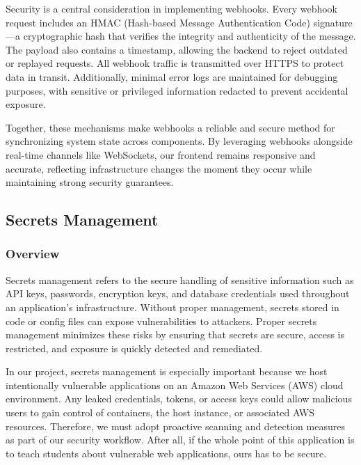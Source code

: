 \documentclass[12pt]{article}
\begin{document}
Security is a central consideration in implementing webhooks. Every webhook request includes an HMAC (Hash-based Message Authentication Code) signature—a cryptographic hash that verifies the integrity and authenticity of the message. The payload also contains a timestamp, allowing the backend to reject outdated or replayed requests. All webhook traffic is transmitted over HTTPS to protect data in transit. Additionally, minimal error logs are maintained for debugging purposes, with sensitive or privileged information redacted to prevent accidental exposure.

Together, these mechanisms make webhooks a reliable and secure method for synchronizing system state across components. By leveraging webhooks alongside real-time channels like WebSockets, our frontend remains responsive and accurate, reflecting infrastructure changes the moment they occur while maintaining strong security guarantees.



\subsection{Secrets Management}

\subsubsection{Overview}
Secrets management refers to the secure handling of sensitive information such as API keys, passwords, encryption keys, and database credentials used throughout an application's infrastructure. Without proper management, secrets stored in code or config files can expose vulnerabilities to attackers. Proper secrets management minimizes these risks by ensuring that secrets are secure, access is restricted, and exposure is quickly detected and remediated. 

In our project, secrets management is especially important because we host intentionally vulnerable applications on an Amazon Web Services (AWS) cloud environment. Any leaked credentials, tokens, or access keys could allow malicious users to gain control of containers, the host instance, or associated AWS resources. Therefore, we must adopt proactive scanning and detection measures as part of our security workflow. After all, if the whole point of this application is to teach students about vulnerable web applications, ours has to be secure.
\end{document}
